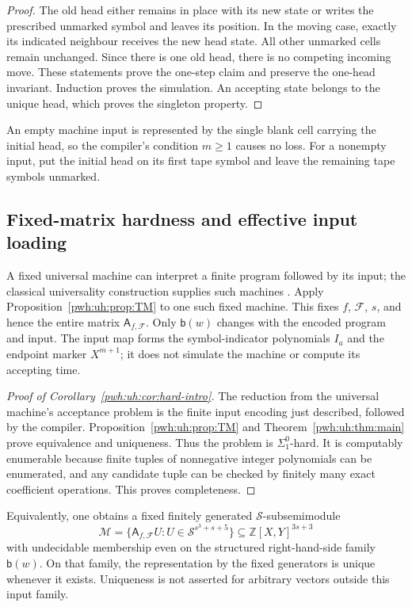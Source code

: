 \documentclass[11pt,letterpaper]{article}
\numberwithin{equation}{section}
\theoremstyle{definition}
\newcommand{\Z}{\mathbb Z}
\newcommand{\F}{\mathcal F}
\newcommand{\Sring}{\mathcal S}
\begin{document}
\begin{proof}
The old head either remains in place with its new state or writes the
prescribed unmarked symbol and leaves its position. In the moving case,
exactly its indicated neighbour receives the new head state. All other
unmarked cells remain unchanged. Since there is one old head, there is
no competing incoming move. These statements prove the one-step claim
and preserve the one-head invariant. Induction proves the simulation.
An accepting state belongs to the unique head, which proves the
singleton property.
\end{proof}

An empty machine input is represented by the single blank cell carrying
the initial head, so the compiler's condition $m\ge1$ causes no loss.
For a nonempty input, put the initial head on its first tape symbol and
leave the remaining tape symbols unmarked.

\subsection{Fixed-matrix hardness and effective input loading}

A fixed universal machine can interpret a finite program followed by its
input; the classical universality construction supplies such machines
\cite{uh:Turing}. Apply Proposition~\ref{pwh:uh:prop:TM} to one such fixed machine.
This fixes $f$, $\F$, $s$, and hence the entire matrix
$\mathsf A_{f,\F}$. Only $\mathsf b(w)$ changes with the encoded program
and input. The input map forms the symbol-indicator polynomials $I_a$
and the endpoint marker $X^{m+1}$; it does not simulate the machine or
compute its accepting time.

\begin{proof}[Proof of Corollary~\ref{pwh:uh:cor:hard-intro}]
The reduction from the universal machine's acceptance problem is the
finite input encoding just described, followed by the compiler.
Proposition~\ref{pwh:uh:prop:TM} and Theorem~\ref{pwh:uh:thm:main} prove equivalence and
uniqueness. Thus the problem is $\Sigma^0_1$-hard. It is computably
enumerable because finite tuples of nonnegative integer polynomials can
be enumerated, and any candidate tuple can be checked by finitely many
exact coefficient operations. This proves completeness.
\end{proof}

Equivalently, one obtains a fixed finitely generated $\Sring$-subsemimodule
\begin{equation}
 \mathcal M=\{\mathsf A_{f,\F}U:U\in\Sring^{s^3+s+5}\}
       \subseteq\Z[X,Y]^{3s+3}
 \label{pwh:uh:eq:subsemimodule}
\end{equation}
with undecidable membership even on the structured right-hand-side family
$\mathsf b(w)$. On that family, the representation by the fixed generators
is unique whenever it exists. Uniqueness is not asserted for arbitrary
vectors outside this input family.
\end{document}
